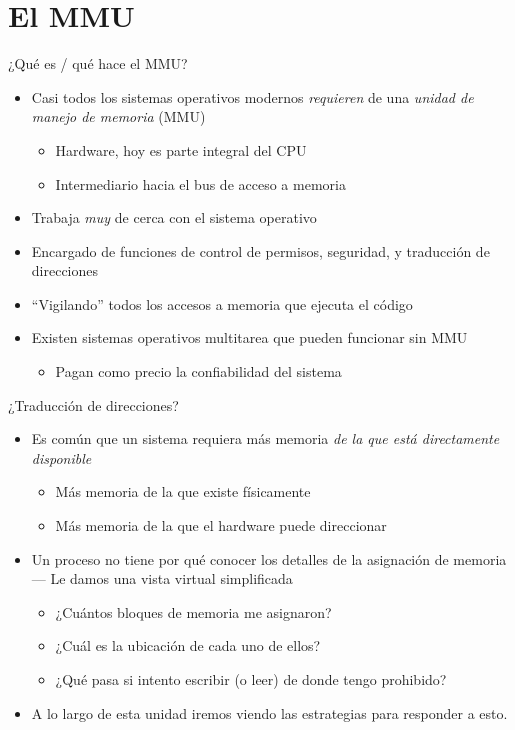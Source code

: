 \documentclass[presentation]{beamer}
\begin{document}
\section{El MMU}
\label{sec:org1ee780f}
\begin{frame}[label={sec:org9cde2e1}]{¿Qué es / qué hace el MMU?}
\begin{itemize}
\item Casi todos los sistemas operativos modernos \emph{requieren} de una
\emph{unidad de manejo de memoria} (MMU)
\begin{itemize}
\item Hardware, hoy es parte integral del CPU
\item Intermediario hacia el bus de acceso a memoria
\end{itemize}
\item Trabaja \emph{muy} de cerca con el sistema operativo
\item Encargado de funciones de control de permisos, seguridad, y
traducción de direcciones
\item ``Vigilando'' todos los accesos a memoria que ejecuta el código
\item Existen sistemas operativos multitarea que pueden funcionar sin MMU
\begin{itemize}
\item Pagan como precio la confiabilidad del sistema
\end{itemize}
\end{itemize}
\end{frame}

\begin{frame}[label={sec:orga655a52}]{¿Traducción de direcciones?}
\begin{itemize}
\item Es común que un sistema requiera más memoria \emph{de la que está
directamente disponible}
\begin{itemize}
\item Más memoria de la que existe físicamente
\item Más memoria de la que el hardware puede direccionar
\end{itemize}
\item Un proceso no tiene por qué conocer los detalles de la asignación de
memoria — Le damos una vista virtual simplificada
\begin{itemize}
\item ¿Cuántos bloques de memoria me asignaron?
\item ¿Cuál es la ubicación de cada uno de ellos?
\item ¿Qué pasa si intento escribir (o leer) de donde tengo prohibido?
\end{itemize}
\item A lo largo de esta unidad iremos viendo las estrategias para
responder a esto.
\end{itemize}
\end{frame}
\end{document}
